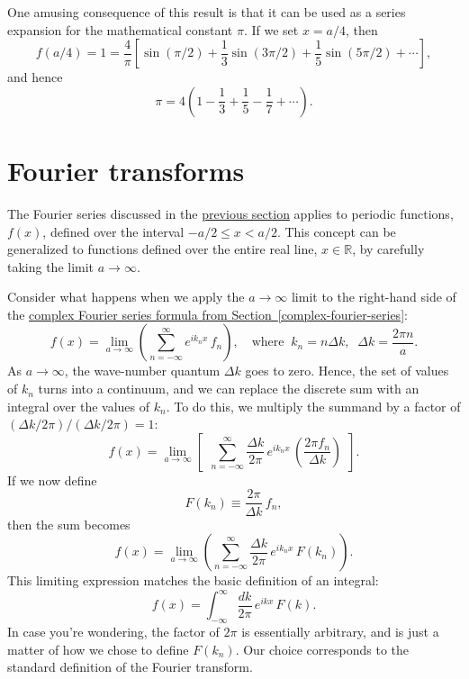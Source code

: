 \documentclass[10pt,a4paper]{article}
\begin{document}
One amusing consequence of this result is that it can be used as a
series expansion for the mathematical constant $\pi$. If we set $x =
a/4$, then
\begin{equation}
  f(a/4) = 1 = \frac{4}{\pi}
  \left[\sin(\pi/2) + \frac{1}{3}\sin(3\pi/2) + \frac{1}{5}\sin(5\pi/2) + \cdots\right],
\end{equation}
and hence
\begin{equation}
  \pi = 4 \left(1 - \frac{1}{3} + \frac{1}{5} - \frac{1}{7} + \cdots\right).
\end{equation}

\section{Fourier transforms}\label{fourier-transforms}

The Fourier series discussed in the \hyperref[fourier-series]{previous
  section} applies to periodic functions, $f(x)$, defined over the
interval $-a/2 \le x < a/2$.  This concept can be generalized to
functions defined over the entire real line, $x \in \mathbb{R}$, by
carefully taking the limit $a \rightarrow \infty$.

Consider what happens when we apply the $a \rightarrow \infty$ limit
to the right-hand side of the
\hyperref[complex-fourier-series]{complex Fourier series formula from
  Section~\ref{complex-fourier-series}}:
\begin{equation}
  f(x) = \lim_{a\rightarrow \infty} \left( \sum_{n=-\infty}^\infty e^{i k_n x}\, f_n\right),
  \quad\mathrm{where}\;\; k_n = n\Delta k, \;\; \Delta k = \frac{2\pi n}{a}.
\end{equation}
As $a \rightarrow \infty$, the wave-number quantum $\Delta k$ goes to
zero. Hence, the set of values of $k_n$ turns into a continuum, and we
can replace the discrete sum with an integral over the values of
$k_n$. To do this, we multiply the summand by a factor of $(\Delta
k/2\pi) / (\Delta k/2\pi) = 1$:
\begin{equation}
  f(x) = \lim_{a\rightarrow \infty} \left[\;\,\sum_{n=-\infty}^\infty
    \frac{\Delta k}{2\pi} \, e^{i k_n x}\, \left(\frac{2\pi f_n}{\Delta k} \right)\;\,\right].
\end{equation}
If we now define
\begin{equation}
  F(k_n) \equiv \frac{2\pi}{\Delta k}\,f_n,
\end{equation}
then the sum becomes
\begin{equation}
  f(x) = \lim_{a\rightarrow \infty} \left( \sum_{n=-\infty}^\infty
  \frac{\Delta k}{2\pi} \, e^{i k_n x}\, F(k_n)\right).
\end{equation}
This limiting expression matches the basic definition of an integral:
\begin{equation}
  f(x) = \int_{-\infty}^{\infty} \frac{dk}{2\pi} \, e^{i k x}\, F(k).
\end{equation}
In case you're wondering, the factor of $2\pi$ is essentially
arbitrary, and is just a matter of how we chose to define $F(k_n)$.
Our choice corresponds to the standard definition of the Fourier
transform.
\end{document}
